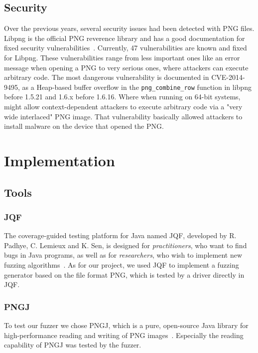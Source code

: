 \documentclass[runningheads]{llncs}
\begin{document}
\subsection{Security}
Over the previous years, several security issues had been detected with PNG files.
Libpng is the official PNG reverence library and has a good documentation for fixed
security vulnerabilities~\cite{security}. Currently, 47 vulnerabilities are known and fixed for Libpng.
These vulnerabilities range from less important ones like an error message when
opening a PNG to very serious ones, where attackers can execute arbitrary code. The
most dangerous vulnerability is documented in CVE-2014-9495, as a Heap-based
buffer overflow in the \texttt{png\_combine\_row} function in libpng before 1.5.21 and 1.6.x
before 1.6.16. Where when running on 64-bit systems, might allow context-dependent attackers to execute arbitrary code via a "very wide interlaced" PNG
image. That vulnerability basically allowed attackers to install malware on the device
that opened the PNG.

\section{Implementation}
\subsection{Tools}
\subsubsection{JQF}
The coverage-guided testing platform for Java named JQF, developed by R. Padhye, C. Lemieux and K. Sen, is designed for \textit{practitioners}, who want to find bugs in Java programs, as well as for \textit{researchers}, who wish to implement new fuzzing algorithms~\cite{JQF_paper}. As for our project, we used JQF to implement a fuzzing generator based on the file format PNG, which is tested by a driver directly in JQF.
\subsubsection{PNGJ}
To test our fuzzer we chose PNGJ, which is a pure, open-source Java library for high-performance reading and writing of PNG images~\cite{PNGJ_github}. Especially the reading capability of PNGJ was tested by the fuzzer.
\end{document}
